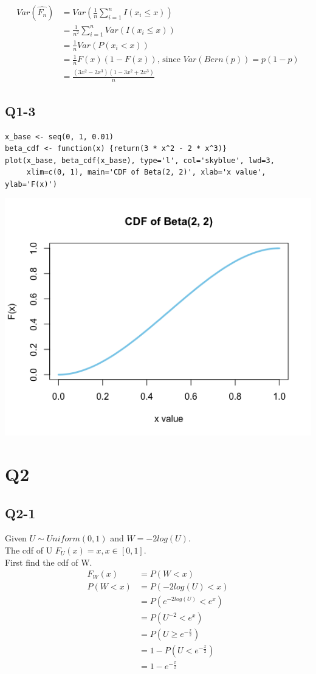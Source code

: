 \documentclass[12pt,letterpaper]{article}
\let\hat\widehat
\begin{document}
\begin{align*}
Var(\hat{F_n}) &= Var(\frac{1}{n} \sum_{i=1}^{n} I(x_i \leq x)) \\
&= \frac{1}{n^2} \sum_{i=1}^{n} Var(I(x_i \leq x)) \\
&= \frac{1}{n} Var(P(x_i < x)) \\
&= \frac{1}{n} F(x)(1 - F(x)) \text{, since } Var(Bern(p)) = p(1-p) \\
&= \frac{(3x^2 - 2x^3)(1 - 3x^2 + 2x^3)}{n}
\end{align*}

\pagebreak
\subsection*{Q1-3}
\begin{verbatim}
x_base <- seq(0, 1, 0.01)
beta_cdf <- function(x) {return(3 * x^2 - 2 * x^3)}
plot(x_base, beta_cdf(x_base), type='l', col='skyblue', lwd=3,
     xlim=c(0, 1), main='CDF of Beta(2, 2)', xlab='x value', ylab='F(x)')
\end{verbatim}

\includegraphics[width=150mm]{plot_beta.png}

\pagebreak
\section*{Q2}
\subsection*{Q2-1}
Given $U \sim Uniform(0, 1) $ and $W = -2log(U)$. \\
\noindent The cdf of U $F_U(x) = x, x \in [0, 1]$. \\
\noindent First find the cdf of W.
\begin{align*}
F_W(x) &= P(W < x) \\
P(W < x) &= P(-2log(U) < x) \\
&= P(e^{-2log(U)} < e^x) \\
&= P(U^{-2} < e^x) \\
&= P(U \geq e^{- \frac{x}{2}}) \\
&= 1 - P(U < e^{- \frac{x}{2}}) \\
&= 1 - e^{- \frac{x}{2}}
\end{align*}
\end{document}

